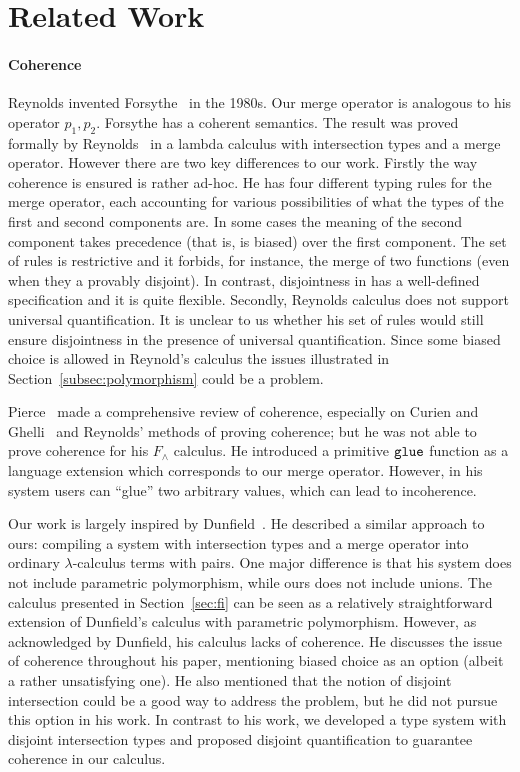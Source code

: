 \section{Related Work}
\label{sec:related-work}

\paragraph{Coherence}
Reynolds invented Forsythe~\cite{reynolds1997design} in the 1980s. Our
merge operator is analogous to his operator $p_1, p_2 $. Forsythe has
a coherent semantics. The result was proved formally by
Reynolds~\cite{reynolds1991coherence} in a lambda calculus with
intersection types and a merge operator. However there are two key
differences to our work. Firstly the way coherence is ensured is
rather ad-hoc. He has four different typing rules for the merge
operator, each accounting for various possibilities of what the types
of the first and second components are. In some cases the meaning of
the second component takes precedence (that is, is biased) over the
first component. The set of rules is restrictive and it forbids, for
instance, the merge of two functions (even when they a provably
disjoint). In contrast, disjointness in \namedis has a well-defined
specification and it is quite flexible. Secondly, Reynolds calculus
does not support universal quantification. It is unclear to us whether
his set of rules would still ensure disjointness in the presence of
universal quantification. Since some biased choice is allowed in
Reynold's calculus the issues illustrated in Section~\ref{subsec:polymorphism} could be a problem.

Pierce~\cite{pierce1991programming2} made a comprehensive review
of coherence, especially on Curien and Ghelli~\cite{curienl1990coherence} and
Reynolds' methods of proving coherence; but he was not able to prove coherence
for his $F_\wedge$ calculus. He introduced a primitive $\texttt{glue}$ function as
a language extension which corresponds to our merge operator. However, in his
system users can ``glue'' two arbitrary values, which can lead to incoherence.

Our work is largely inspired by
Dunfield~\cite{dunfield2014elaborating}. He described a similar
approach to ours: compiling a system with intersection types and a
merge operator into
ordinary $ \lambda $-calculus terms with pairs. One major difference
is that his system does not include parametric polymorphism, while
ours does not include unions. The calculus presented in
Section~\ref{sec:fi} can be seen as a relatively straightforward
extension of Dunfield's calculus with parametric
polymorphism. However, as acknowledged by Dunfield, his calculus lacks
of coherence. He discusses the issue of coherence throughout his
paper, mentioning biased choice as an option (albeit a rather
unsatisfying one). He also mentioned that the notion of disjoint
intersection could be a good way to address the problem, but he did not
pursue this option in his work. In contrast to his work, we developed a type
system with disjoint intersection types and proposed disjoint
quantification to guarantee coherence in our calculus.

